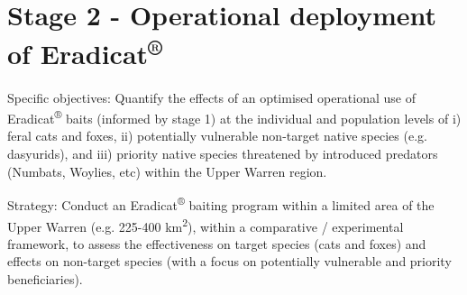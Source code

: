 \documentclass[version=last,
    paper=a4,                               %
    10pt,                                   %
    dvipsnames,
    oneside,                              %
    headings=openany,                       %
    open=any,
    BCOR=7mm,                               %
    DIV=15,     %
]{scrbook}
\begin{document}
\section{Stage 2 - Operational deployment of
Eradicat\textsuperscript{®}}

Specific objectives: Quantify the effects of an optimised operational
use of Eradicat\textsuperscript{®} baits (informed by stage 1) at the
individual and population levels of i) feral cats and foxes, ii)
potentially vulnerable non-target native species (e.g. dasyurids), and
iii) priority native species threatened by introduced predators
(Numbats, Woylies, etc) within the Upper Warren region.

Strategy: Conduct an Eradicat\textsuperscript{®} baiting program within
a limited area of the Upper Warren (e.g. 225-400 km\textsuperscript{2}),
within a comparative / experimental framework, to assess the
effectiveness on target species (cats and foxes) and effects on
non-target species (with a focus on potentially vulnerable and priority
beneficiaries).

~
\end{document}
